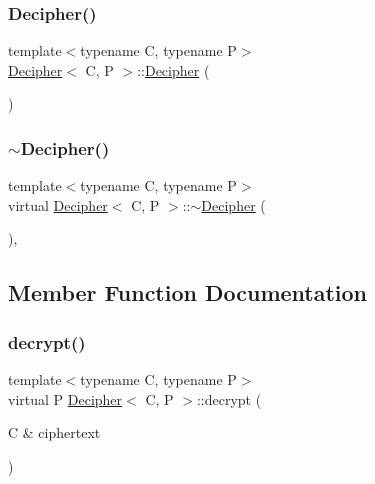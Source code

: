 \subsubsection{\texorpdfstring{Decipher()}{Decipher()}}
{\footnotesize\ttfamily template$<$typename C, typename P$>$ \\
\hyperlink{classDecipher}{Decipher}$<$ C, P $>$\+::\hyperlink{classDecipher}{Decipher} (\begin{DoxyParamCaption}{ }\end{DoxyParamCaption})\hspace{0.3cm}{\ttfamily [inline]}}

\mbox{\label{classDecipher_af1489f4e86a28217bdee9cf16d983faf}} 
\subsubsection{\texorpdfstring{$\sim$\+Decipher()}{~Decipher()}}
{\footnotesize\ttfamily template$<$typename C, typename P$>$ \\
virtual \hyperlink{classDecipher}{Decipher}$<$ C, P $>$\+::$\sim$\hyperlink{classDecipher}{Decipher} (\begin{DoxyParamCaption}{ }\end{DoxyParamCaption})\hspace{0.3cm}{\ttfamily [inline]}, {\ttfamily [virtual]}}



\subsection{Member Function Documentation}
\mbox{\label{classDecipher_ac6b8c369eda2d7e17fa90cb594cf41b6}} 
\subsubsection{\texorpdfstring{decrypt()}{decrypt()}}
{\footnotesize\ttfamily template$<$typename C, typename P$>$ \\
virtual P \hyperlink{classDecipher}{Decipher}$<$ C, P $>$\+::decrypt (\begin{DoxyParamCaption}\item[{C \&}]{ciphertext }\end{DoxyParamCaption})\hspace{0.3cm}{\ttfamily [pure virtual]}}



